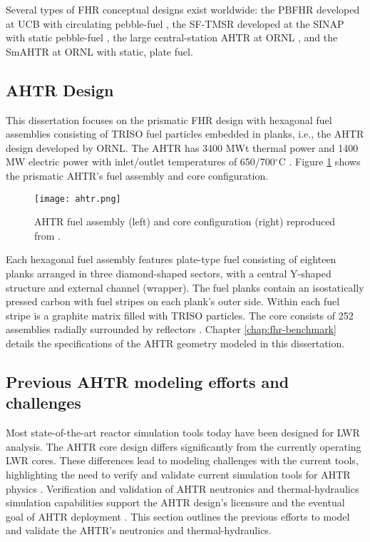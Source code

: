 Several types of \gls{FHR} conceptual designs exist worldwide: the \gls{PBFHR} 
developed at \gls{UCB} with circulating pebble-fuel 
\cite{scarlat_current_2014,krumwiede_three-dimensional_2013}, the \gls{SF-TMSR} 
developed at the \gls{SINAP} with static pebble-fuel \cite{liu_preliminary_2016}, 
the large central-station \gls{AHTR} at \gls{ORNL} \cite{holcomb_core_2011, varma_ahtr_2012}, 
and the \gls{SmAHTR} at ORNL \cite{greene_pre-conceptual_2010} with static, 
plate fuel. 

\subsection{\acrlong{AHTR} Design}
This dissertation focuses on the prismatic \gls{FHR} design with hexagonal fuel 
assemblies consisting of \gls{TRISO} fuel particles embedded in planks, i.e., 
the \gls{AHTR} design developed by ORNL. 
The \gls{AHTR} has 3400 MWt thermal power and 1400 MW electric power with
inlet/outlet temperatures of 650/700$^{\circ}$C \cite{varma_ahtr_2012}.  
Figure \ref{fig:ahtr} shows the prismatic AHTR's fuel assembly and core 
configuration.  
\begin{figure}[htb!]
    \centering
    \texttt{[image: ahtr.png]} 
    \caption{\acrlong{AHTR} fuel assembly (left) and core configuration (right) 
    reproduced from \cite{ramey_monte_2018}.}
    \label{fig:ahtr}
\end{figure}
Each hexagonal fuel assembly features plate-type fuel consisting of eighteen 
planks arranged in three diamond-shaped sectors, with a central Y-shaped 
structure and external channel (wrapper).
The fuel planks contain an isostatically pressed carbon with fuel stripes 
on each plank's outer side.
Within each fuel stripe is a graphite matrix filled with \gls{TRISO} particles. 
The core consists of 252 assemblies radially surrounded by reflectors
\cite{ramey_monte_2018}. 
Chapter \ref{chap:fhr-benchmark} details the specifications of the AHTR geometry
modeled in this dissertation.

\subsection{Previous AHTR modeling efforts and challenges} 
\label{sec:previous_ahtr}
Most state-of-the-art reactor simulation tools today have been designed for 
\gls{LWR} analysis.
The \gls{AHTR} core design differs significantly from the currently operating \gls{LWR} 
cores.  
These differences lead to modeling challenges with the current tools, highlighting
the need to verify and validate current simulation tools for \gls{AHTR} physics 
\cite{ramey_monte_2018}. 
Verification and validation of \gls{AHTR} neutronics and thermal-hydraulics 
simulation capabilities support the \gls{AHTR} design's licensure and the
eventual goal of \gls{AHTR} deployment 
\cite{rahnema_phenomena_2019,rahnema_current_2015}.
This section outlines the previous efforts to model and validate 
the \gls{AHTR}'s neutronics and thermal-hydraulics. 

